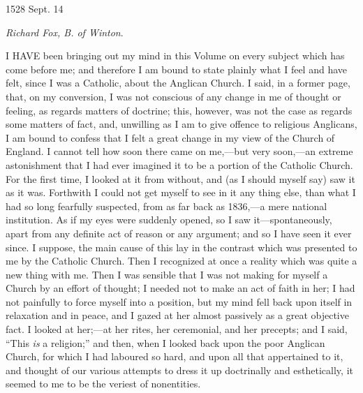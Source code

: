 1528 Sept.
14

\emph{Richard Fox, B. of Winton}.


I HAVE been bringing out my mind in this Volume on every
subject which has come before me; and therefore I am bound to state
plainly what I feel and have felt, since I was a Catholic, about the
Anglican Church. I said, in a former page, that, on my conversion, I was
not conscious of any change in me of thought or feeling, as regards
matters of doctrine; this, however, was not the case as regards some
matters of fact, and, unwilling as I am to give offence to religious
Anglicans, I am bound to confess that I felt a great change in my view
of the Church of England. I cannot tell how soon there came on me,—but
very soon,—an extreme astonishment that I had ever imagined it to be a
portion of the Catholic Church. For the first time, I looked at it from
without, and (as I should myself say) saw it as it was. Forthwith I
could not get myself to see in it any thing else, than what I had so
long fearfully suspected, from as far back as 1836,—a mere
national institution. As if my eyes were suddenly opened, so I saw it—spontaneously,
apart from any definite act of reason or any argument; and so I have
seen it ever since. I suppose, the main cause of this lay in the
contrast which was presented to me by the Catholic Church. Then I
recognized at once a reality which was quite a new thing with me. Then I
was sensible that I was not making for myself a Church by an effort of
thought; I needed not to make an act of faith in her; I had not
painfully to force myself into a position, but my mind fell back upon
itself in relaxation and in peace, and I gazed at her almost passively
as a great objective fact. I looked at her;—at her rites, her
ceremonial, and her precepts; and I said, ``This \emph{is} a
religion;'' and then, when I looked back upon the poor Anglican
Church, for which I had laboured so hard, and upon all that appertained
to it, and thought of our various attempts to dress it up doctrinally
and esthetically, it seemed to me to be the veriest of nonentities.


